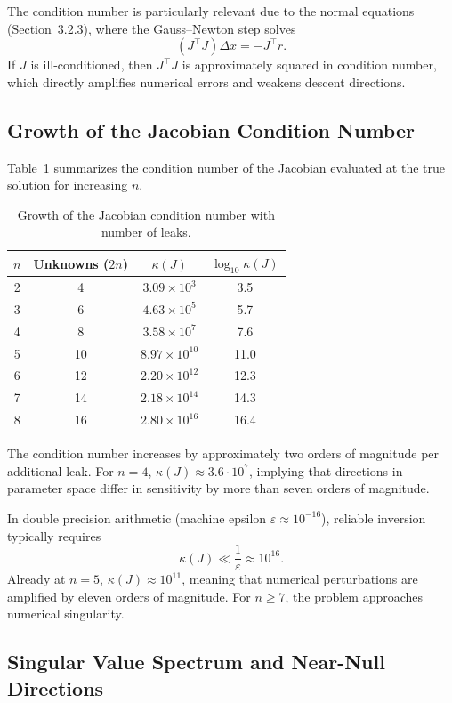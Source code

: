The condition number is particularly relevant due to the normal equations (Section~3.2.3), where the Gauss--Newton step solves
\[
(J^\top J)\Delta x = -J^\top r.
\]
If $J$ is ill-conditioned, then $J^\top J$ is approximately squared in condition number, which directly amplifies numerical errors and weakens descent directions.

\subsection*{Growth of the Jacobian Condition Number}

Table~\ref{tab:cond_growth} summarizes the condition number of the Jacobian evaluated at the true solution for increasing $n$.

\begin{table}[ht]
\centering
\begin{tabular}{c c c c}
\hline
$n$ & Unknowns ($2n$) & $\kappa(J)$ & $\log_{10}\kappa(J)$ \\
\hline
2 & 4  & $3.09 \times 10^{3}$  & 3.5 \\
3 & 6  & $4.63 \times 10^{5}$  & 5.7 \\
4 & 8  & $3.58 \times 10^{7}$  & 7.6 \\
5 & 10 & $8.97 \times 10^{10}$ & 11.0 \\
6 & 12 & $2.20 \times 10^{12}$ & 12.3 \\
7 & 14 & $2.18 \times 10^{14}$ & 14.3 \\
8 & 16 & $2.80 \times 10^{16}$ & 16.4 \\
\hline
\end{tabular}
\caption{Growth of the Jacobian condition number with number of leaks.}
\label{tab:cond_growth}
\end{table}

The condition number increases by approximately two orders of magnitude per additional leak. For $n=4$, $\kappa(J) \approx 3.6 \cdot 10^7$, implying that directions in parameter space differ in sensitivity by more than seven orders of magnitude.

In double precision arithmetic (machine epsilon $\varepsilon \approx 10^{-16}$), reliable inversion typically requires
\[
\kappa(J) \ll \frac{1}{\varepsilon} \approx 10^{16}.
\]
Already at $n=5$, $\kappa(J) \approx 10^{11}$, meaning that numerical perturbations are amplified by eleven orders of magnitude. For $n \geq 7$, the problem approaches numerical singularity.

\subsection*{Singular Value Spectrum and Near-Null Directions}

